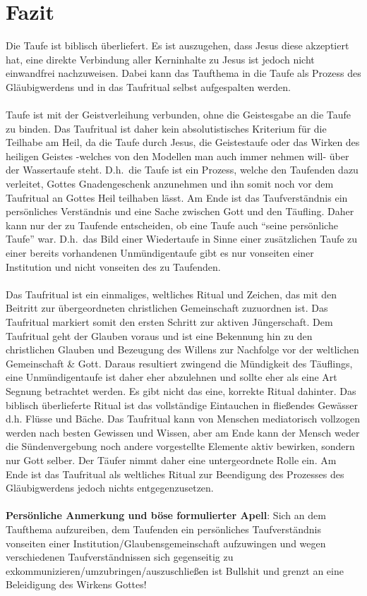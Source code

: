 \section{Fazit}
Die Taufe ist biblisch überliefert. Es ist auszugehen, dass Jesus diese akzeptiert hat, eine direkte Verbindung aller Kerninhalte zu Jesus ist jedoch nicht einwandfrei nachzuweisen. Dabei kann das Taufthema in die Taufe als Prozess des Gläubigwerdens und in das Taufritual selbst aufgespalten werden.
\\~\\
Taufe ist mit der Geistverleihung verbunden, ohne die Geistesgabe an die Taufe zu binden.
Das Taufritual ist daher kein absolutistisches Kriterium für die Teilhabe am Heil, da die Taufe durch Jesus, die Geistestaufe oder das Wirken des heiligen Geistes  -welches von den Modellen man auch immer nehmen will- über der Wassertaufe steht. D.h.\ die Taufe ist ein Prozess, welche den Taufenden dazu verleitet, Gottes Gnadengeschenk anzunehmen und ihn somit noch vor dem Taufritual an Gottes Heil teilhaben lässt. Am Ende ist das Taufverständnis ein persönliches Verständnis und eine Sache zwischen Gott und den Täufling. Daher kann nur der zu Taufende entscheiden, ob eine Taufe auch ``seine persönliche Taufe'' war. D.h.\ das Bild einer Wiedertaufe in Sinne einer zusätzlichen Taufe zu einer bereits vorhandenen Unmündigentaufe gibt es nur vonseiten einer Institution und nicht vonseiten des zu Taufenden.
\\~\\
Das Taufritual ist ein einmaliges, weltliches Ritual und Zeichen,
das mit den Beitritt zur übergeordneten christlichen Gemeinschaft zuzuordnen ist. Das Taufritual markiert somit den ersten Schritt zur aktiven Jüngerschaft. Dem Taufritual geht der Glauben voraus
und ist eine Bekennung hin zu den christlichen Glauben und Bezeugung des Willens zur Nachfolge vor der weltlichen Gemeinschaft \& Gott. Daraus resultiert zwingend die Mündigkeit des Täuflings, eine Unmündigentaufe ist daher eher abzulehnen
und sollte eher als eine Art Segnung betrachtet werden. Es gibt nicht das eine, korrekte Ritual dahinter. Das biblisch überlieferte Ritual ist das vollständige Eintauchen in fließendes Gewässer d.h. Flüsse und Bäche. Das Taufritual kann von Menschen
mediatorisch vollzogen werden nach besten Gewissen und Wissen, aber am Ende kann der Mensch weder die Sündenvergebung noch andere vorgestellte Elemente aktiv bewirken, sondern nur Gott selber. Der Täufer nimmt daher eine untergeordnete Rolle ein. Am Ende ist das Taufritual als weltliches Ritual zur Beendigung des Prozesses des Gläubigwerdens jedoch nichts entgegenzusetzen.
\\~\\
\textbf{Persönliche Anmerkung und böse formulierter Apell}: Sich an dem Taufthema aufzureiben, dem Taufenden ein persönliches Taufverständnis vonseiten einer Institution/Glaubensgemeinschaft aufzuwingen und wegen verschiedenen Taufverständnissen sich gegenseitig zu exkommunizieren/umzubringen/auszuschließen ist Bullshit und grenzt an eine Beleidigung des Wirkens Gottes!


